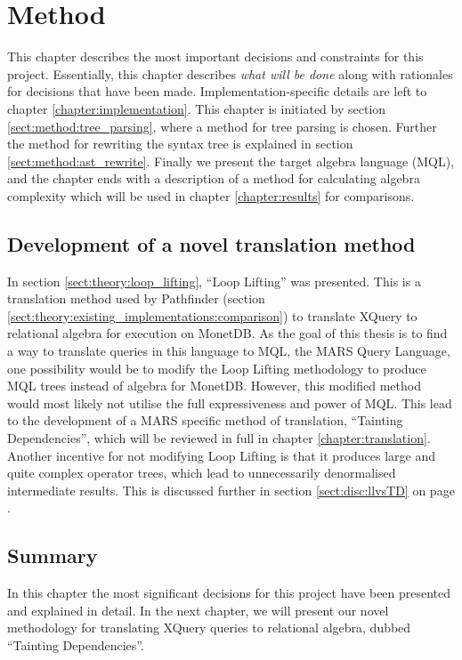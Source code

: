 \chapter{Method}
\label{chapter:method}
This chapter describes the most important decisions and constraints for this
project. Essentially, this chapter describes \emph{what will be done} along
with rationales for decisions that have been made. Implementation-specific
details are left to chapter \ref{chapter:implementation}. This chapter is
initiated by section \ref{sect:method:tree_parsing}, where a method for tree
parsing is chosen. Further the method for rewriting the syntax tree is
explained in section \ref{sect:method:ast_rewrite}. Finally we present the
target algebra language (MQL), and the chapter ends with a description of a
method for calculating algebra complexity which will be used in chapter
\ref{chapter:results} for comparisons.

\section{Development of a novel translation method}

In section \ref{sect:theory:loop_lifting}, ``Loop Lifting'' was presented. This
is a translation method used by Pathfinder (section
\ref{sect:theory:existing_implementations:comparison}) to translate XQuery to
relational algebra for execution on MonetDB. As the goal of this thesis is to
find a way to translate queries in this language to MQL, the MARS Query
Language, one possibility would be to modify the Loop Lifting methodology to
produce MQL trees instead of algebra for MonetDB. However, this modified
method would most likely not utilise the full expressiveness and power of MQL.
This lead to the development of a MARS specific method of translation,
``Tainting Dependencies'', which will be reviewed in full in chapter
\ref{chapter:translation}. Another incentive for not modifying Loop Lifting is
that it produces large and quite complex operator trees, which lead to
unnecessarily denormalised intermediate results. This is discussed further in
section \ref{sect:disc:llvsTD} on page \pageref{sect:disc:llvsTD}.







\section{Summary}
\label{sect:method:summary}
In this chapter the most significant decisions for this project have been
presented and explained in detail. In the next chapter, we will present our
novel methodology for translating XQuery queries to relational algebra, dubbed
``Tainting Dependencies''.
